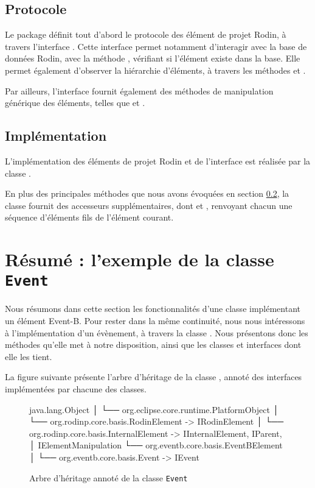 \subsection{Protocole}

Le package  définit tout d'abord le protocole des élément de projet Rodin, à travers l'interface .
Cette interface permet notamment d'interagir avec la base de données Rodin, avec la méthode , vérifiant si l'élément existe dans la base.
Elle permet également d'observer la hiérarchie d'éléments, à travers les méthodes  et .

Par ailleurs, l'interface  fournit également des méthodes de manipulation générique des éléments, telles que  et %
.


\subsection{Implémentation}\label{sec:rodinProjectElementProtocol}

L'implémentation des éléments de projet Rodin et de l'interface  est réalisée par la classe .

En plus des principales méthodes que nous avons évoquées en section \ref{sec:rodinProjectElementProtocol}, la classe  fournit %
des accesseurs supplémentaires, dont  et , renvoyant chacun une séquence d'éléments fils de l'élément courant.


\section{Résumé : l'exemple de la classe \texttt{Event}}

Nous résumons dans cette section les fonctionnalités d'une classe implémentant un élément Event-B.
Pour rester dans la même continuité, nous nous intéressons à l'implémentation d'un évènement, à travers la classe .
Nous présentons donc les méthodes qu'elle met à notre disposition, ainsi que les classes et interfaces dont elle les tient.

La figure suivante présente l'arbre d'héritage de la classe , annoté des interfaces implémentées par chacune des classes.

\begin{figure}[H]
\centering
\begin{imtaConsole}
java.lang.Object
│
└── org.eclipse.core.runtime.PlatformObject
    │
    └── org.rodinp.core.basis.RodinElement              -> IRodinElement
        │
        └── org.rodinp.core.basis.InternalElement       -> IInternalElement, IParent,
            │                                              IElementManipulation
            └── org.eventb.core.basis.EventBElement
                │
                └── org.eventb.core.basis.Event         -> IEvent
\end{imtaConsole}
\caption{Arbre d'héritage annoté de la classe \texttt{Event}}
\label{fig:inheritanceTreeEvent}
\end{figure}

